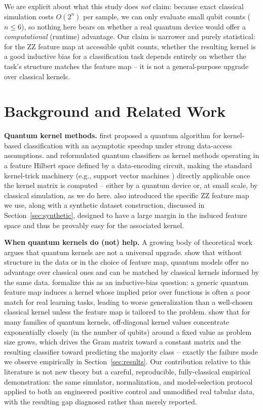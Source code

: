 \documentclass{article}
\begin{document}
We are explicit about what this study does \emph{not} claim: because exact
classical simulation costs $O(2^n)$ per sample, we can only evaluate small
qubit counts ($n \le 6$), so nothing here bears on whether a real quantum
device would offer a \emph{computational} (runtime) advantage. Our claim is
narrower and purely statistical: for the ZZ feature map at accessible qubit
counts, whether the resulting kernel is a good inductive bias for a
classification task depends entirely on whether the task's structure matches
the feature map -- it is not a general-purpose upgrade over classical
kernels.

\section{Background and Related Work}
\label{sec:background}

\textbf{Quantum kernel methods.} \citet{rebentrost2014quantum} first proposed
a quantum algorithm for kernel-based classification with an asymptotic
speedup under strong data-access assumptions. \citet{schuld2019quantum} and
\citet{havlicek2019supervised} reformulated quantum classifiers as kernel
methods operating in a feature Hilbert space defined by a data-encoding
circuit, making the standard kernel-trick machinery (e.g., support vector
machines \citep{cortes1995support}) directly applicable once the kernel
matrix is computed -- either by a quantum device or, at small scale, by
classical simulation, as we do here. \citet{havlicek2019supervised} also
introduced the specific ZZ feature map we use, along with a synthetic dataset
construction, discussed in Section~\ref{sec:synthetic}, designed to have a
large margin in the induced feature space and thus be provably easy for the
associated kernel.

\textbf{When quantum kernels do (not) help.} A growing body of theoretical
work argues that quantum kernels are not a universal upgrade.
\citet{huang2021power} show that without structure in the data or in the
choice of feature map, quantum models offer no advantage over classical ones
and can be matched by classical kernels informed by the same data.
\citet{kubler2021inductive} formalize this as an inductive-bias question: a
generic quantum feature map induces a kernel whose implied prior over
functions is often a poor match for real learning tasks, leading to worse
generalization than a well-chosen classical kernel unless the feature map is
tailored to the problem. \citet{thanasilp2024exponential} show that for many
families of quantum kernels, off-diagonal kernel values concentrate
exponentially closely (in the number of qubits) around a fixed value as
problem size grows, which drives the Gram matrix toward a constant matrix and
the resulting classifier toward predicting the majority class -- exactly the
failure mode we observe empirically in Section~\ref{sec:results}. Our
contribution relative to this literature is not new theory but a careful,
reproducible, fully-classical empirical demonstration: the same simulator,
normalization, and model-selection protocol applied to both an engineered
positive control and unmodified real tabular data, with the resulting gap
diagnosed rather than merely reported.
\end{document}
